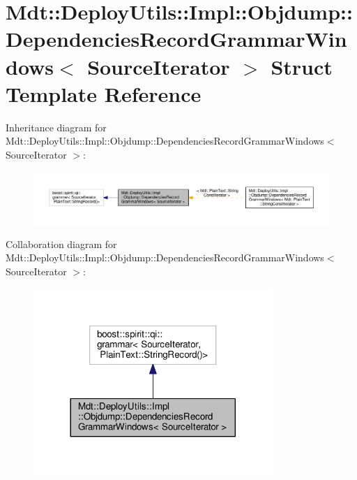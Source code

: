 \hypertarget{struct_mdt_1_1_deploy_utils_1_1_impl_1_1_objdump_1_1_dependencies_record_grammar_windows}{}\section{Mdt\+:\+:Deploy\+Utils\+:\+:Impl\+:\+:Objdump\+:\+:Dependencies\+Record\+Grammar\+Windows$<$ Source\+Iterator $>$ Struct Template Reference}
\label{struct_mdt_1_1_deploy_utils_1_1_impl_1_1_objdump_1_1_dependencies_record_grammar_windows}


Inheritance diagram for Mdt\+:\+:Deploy\+Utils\+:\+:Impl\+:\+:Objdump\+:\+:Dependencies\+Record\+Grammar\+Windows$<$ Source\+Iterator $>$\+:
\nopagebreak
\begin{figure}[H]
\begin{center}
\leavevmode
\includegraphics[width=350pt]{struct_mdt_1_1_deploy_utils_1_1_impl_1_1_objdump_1_1_dependencies_record_grammar_windows__inherit__graph}
\end{center}
\end{figure}


Collaboration diagram for Mdt\+:\+:Deploy\+Utils\+:\+:Impl\+:\+:Objdump\+:\+:Dependencies\+Record\+Grammar\+Windows$<$ Source\+Iterator $>$\+:
\nopagebreak
\begin{figure}[H]
\begin{center}
\leavevmode
\includegraphics[width=257pt]{struct_mdt_1_1_deploy_utils_1_1_impl_1_1_objdump_1_1_dependencies_record_grammar_windows__coll__graph}
\end{center}
\end{figure}


